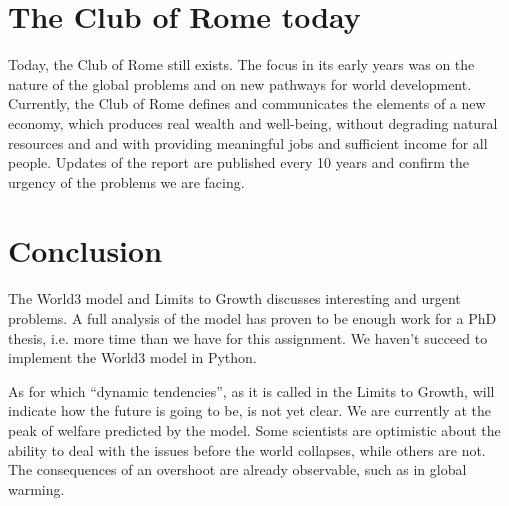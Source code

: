 \documentclass[10pt,a4paper]{scrartcl}
\begin{document}
\section*{The Club of Rome today}

Today, the Club of Rome still exists. The focus in its early years was on the nature of the global problems and on new pathways for world development. Currently, the Club of Rome defines and communicates the elements of a new economy, which produces real wealth and well-being, without degrading natural resources and and with providing meaningful jobs and sufficient income for all people. Updates of the report are published every 10 years and confirm the urgency of the problems we are facing.

\section*{Conclusion}

The World3 model and Limits to Growth discusses interesting and urgent problems. A full analysis of the model has proven to be enough work for a PhD thesis, i.e. more time than we have for this assignment. We haven't succeed to implement the World3 model in Python.

As for which ``dynamic tendencies'', as it is called in the Limits to Growth, will indicate how the future is going to be, is not yet clear. We are currently at the peak of welfare predicted by the model. Some scientists are optimistic about the ability to deal with the issues before the world collapses, while others are not. The consequences of an overshoot are already observable, such as in global warming.


\nocite{*}

\end{document}
